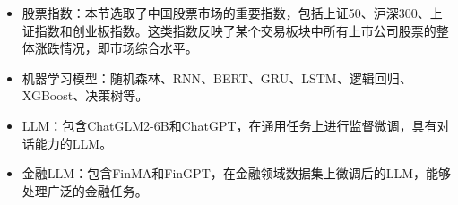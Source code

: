 \begin{itemize}[topsep = 0 pt, itemsep= 0 pt, parsep=0pt, partopsep=0pt, leftmargin=36pt, itemindent=0pt, labelsep=6pt, listparindent=24pt]
	\item 股票指数：本节选取了中国股票市场的重要指数，包括上证50、沪深300、上证指数和创业板指数。这类指数反映了某个交易板块中所有上市公司股票的整体涨跌情况，即市场综合水平。
	\item 机器学习模型：随机森林\cite{DBLP:journals/pami/Ho98}、RNN\cite{rumelhart1986learning}、BERT\cite{DBLP:conf/naacl/DevlinCLT19}、GRU\cite{DBLP:conf/emnlp/ChoMGBBSB14}、LSTM\cite{DBLP:journals/neco/HochreiterS97}、逻辑回归\cite{cox1958regression}、XGBoost\cite{DBLP:conf/kdd/ChenG16}、决策树\cite{DBLP:books/mk/Quinlan93}等。
	\item LLM：包含ChatGLM2-6B\cite{DBLP:conf/iclr/ZengLDWL0YXZXTM23}和ChatGPT\cite{DBLP:conf/nips/Ouyang0JAWMZASR22}，在通用任务上进行监督微调，具有对话能力的LLM。
	\item 金融LLM：包含FinMA\cite{DBLP:journals/corr/abs-2306-05443}和FinGPT\cite{DBLP:journals/corr/abs-2306-06031}，在金融领域数据集上微调后的LLM，能够处理广泛的金融任务。
\end{itemize}

